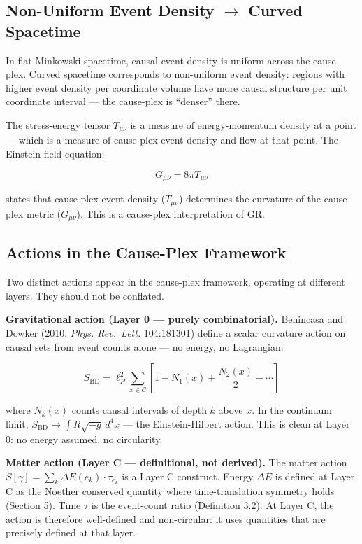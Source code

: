 \documentclass[11pt]{article}
\theoremstyle{definition}
\theoremstyle{remark}
\begin{document}
\subsection{\texorpdfstring{Non-Uniform Event Density \(\to\) Curved
Spacetime}{Non-Uniform Event Density \textbackslash to Curved Spacetime}}\label{non-uniform-event-density-to-curved-spacetime}

In flat Minkowski spacetime, causal event density is uniform across the
cause-plex. Curved spacetime corresponds to non-uniform event density:
regions with higher event density per coordinate volume have more causal
structure per unit coordinate interval --- the cause-plex is ``denser''
there.

The stress-energy tensor \(T_{\mu\nu}\) is a measure of energy-momentum
density at a point --- which is a measure of cause-plex event density
and flow at that point. The Einstein field equation:

\[G_{\mu\nu} = 8\pi T_{\mu\nu}\]

states that cause-plex event density (\(T_{\mu\nu}\)) determines the
curvature of the cause-plex metric (\(G_{\mu\nu}\)). This is a
cause-plex interpretation of GR.

\subsection{Actions in the Cause-Plex
Framework}\label{actions-in-the-cause-plex-framework}

Two distinct actions appear in the cause-plex framework, operating at
different layers. They should not be conflated.

\textbf{Gravitational action (Layer 0 --- purely combinatorial).}
Benincasa and Dowker (2010, \emph{Phys. Rev.~Lett.} 104:181301) define a
scalar curvature action on causal sets from event counts alone --- no
energy, no Lagrangian:

\[S_{\text{BD}} = \ell_P^2 \sum_{x \in \mathcal{C}} \left[ 1 - N_1(x) + \frac{N_2(x)}{2} - \cdots \right]\]

where \(N_k(x)\) counts causal intervals of depth \(k\) above \(x\). In
the continuum limit, \(S_{\text{BD}} \to \int R \sqrt{-g}\, d^4x\) ---
the Einstein-Hilbert action. This is clean at Layer 0: no energy
assumed, no circularity.

\textbf{Matter action (Layer C --- definitional, not derived).} The
matter action \(S[\gamma] = \sum_k \Delta E(e_k) \cdot \tau_{e_k}\) is a
Layer C construct. Energy \(\Delta E\) is defined at Layer C as the
Noether conserved quantity where time-translation symmetry holds
(Section 5). Time \(\tau\) is the event-count ratio (Definition 3.2). At
Layer C, the action is therefore well-defined and non-circular: it uses
quantities that are precisely defined at that layer.
\end{document}
